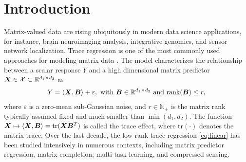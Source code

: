\documentclass[aos]{imsart}
\theoremstyle{definition}
\begin{document}

\section{Introduction}
\label{sec:intro}

Matrix-valued data are rising ubiquitously in modern data science applications, for instance, brain neuroimaging analysis, integrative genomics, and sensor network localization. Trace regression is one of the most commonly used approaches for modeling matrix data \cite{fan2019generalized,hamidi2019low}. The model characterizes the relationship between a scalar response $Y$ and a high dimensional matrix predictor $\bm X \in \mathcal{X} \subset \mathbb{R}^{d_1\times d_2}$ as 
\begin{equation}\label{eq:linear}
Y=\langle \mX, \mB \rangle+ \varepsilon,\ \text{with } \mB \in \mathbb{R}^{d_1\times d_2} \text{ and rank}(\mB)\leq r,
\end{equation}
where $\varepsilon$ is a zero-mean sub-Gaussian noise, and $r\in\mathbb{N}_{+}$ is the matrix rank typically assumed fixed and much smaller than $\min(d_1,d_2)$. The function $\bm X\mapsto \langle \bm X,\bm B\rangle=\text{tr}(\bm X\bm B^T)$ is called the trace effect, where $\text{tr}(\cdot)$ denotes the matrix trace. Over the last decade, the low-rank trace regression \eqref{eq:linear} has been studied intensively in numerous contexts, including matrix predictor regression, matrix completion, multi-task learning, and compressed sensing.
\end{document}
